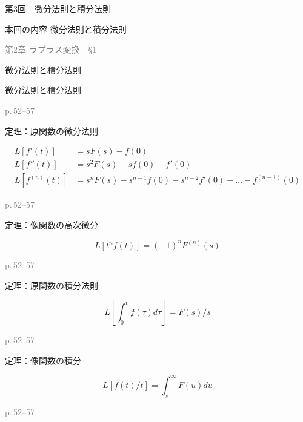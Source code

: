 \documentclass[aspectratio=43,professionalfonts,handout]{beamer}
\begin{document}
\begin{frame}{第3回　微分法則と積分法則}
  \begin{block}{本回の内容}
  微分法則と積分法則
  \end{block}
  \vfill\hfill{\scriptsize \textcolor{gray}{第2章 ラプラス変換　§1}}
\end{frame}

\begin{frame}{微分法則と積分法則}
  \begin{block}{}
  {\large 微分法則と積分法則}
  \end{block}
  \vfill\hfill{\scriptsize \textcolor{gray}{p.\,52--57}}
\end{frame}

\begin{frame}{定理：原関数の微分法則}
  \begin{block}{}
  \begin{align*}
    L[f'(t)]    &= sF(s) - f(0) \\
    L[f''(t)]   &= s^{2}F(s) - sf(0) - f'(0) \\
    L[f^{(n)}(t)] &= s^n F(s) - s^{n-1}f(0) - s^{n-2}f'(0) - \ldots - f^{(n-1)}(0)
  \end{align*}
  \end{block}
  \vfill\hfill{\scriptsize \textcolor{gray}{p.\,52--57}}
\end{frame}

\begin{frame}{定理：像関数の高次微分}
  \begin{block}{}
  \[
    L[t^n f(t)] = (-1)^n F^{(n)}(s)
  \]
  \end{block}
  \vfill\hfill{\scriptsize \textcolor{gray}{p.\,52--57}}
\end{frame}

\begin{frame}{定理：原関数の積分法則}
  \begin{block}{}
  \[
    L[\int_{0}^t f(\tau)d\tau] = F(s)/s
  \]
  \end{block}
  \vfill\hfill{\scriptsize \textcolor{gray}{p.\,52--57}}
\end{frame}

\begin{frame}{定理：像関数の積分}
  \begin{block}{}
  \[
    L[f(t)/t] = \int_{s}^\infty F(u)du
  \]
  \end{block}
  \vfill\hfill{\scriptsize \textcolor{gray}{p.\,52--57}}
\end{frame}
\end{document}
